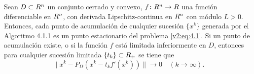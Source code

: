 \begin{theorem}\label{v2:thm:4.1.1}
    Sean $D \subset R^n$ un conjunto cerrado y convexo, $f \colon R^n \to R$ una función diferenciable en $R^n$, con derivada Lipschitz-continua en $R^n$ con módulo $L > 0$.
    Entonces, cada punto de acumulación de cualquier sucesión $\{x^k\}$ generada por el Algoritmo 4.1.1 es un punto estacionario del problema \eqref{v2:eq:4.1}. Si un punto de acumulación existe, o si la función $f$ está limitada inferiormente en $D$, entonces para cualquier sucesión limitada $\{t_k\} \subset R_+$ se tiene que
    \begin{equation}
        \|x^k - P_D(x^k - t_k f'(x^k))\| \to 0 \quad (k \to \infty).
        \label{v2:eq:4.11}
    \end{equation}
\end{theorem}
